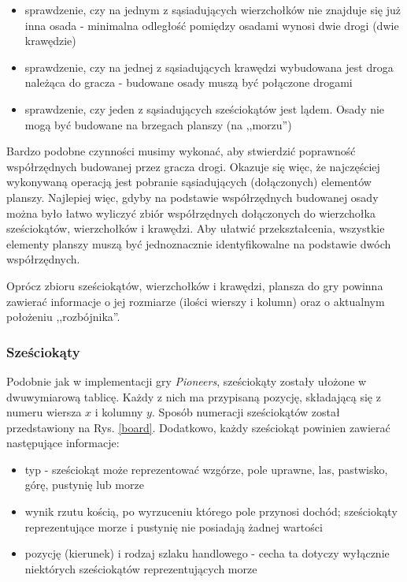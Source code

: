 \documentclass[a4paper,12pt]{article}
\providecommand{\imref}[1]{Rys. \ref{#1}} %
\begin{document}
\begin{itemize}
\item sprawdzenie, czy na jednym z sąsiadujących wierzchołków nie
  znajduje się już inna osada - minimalna odległość pomiędzy osadami
  wynosi dwie drogi (dwie krawędzie)
\item sprawdzenie, czy na jednej z sąsiadujących krawędzi wybudowana
  jest droga należąca do gracza - budowane osady muszą być połączone
  drogami
\item sprawdzenie, czy jeden z sąsiadujących sześciokątów jest
  lądem. Osady nie mogą być budowane na brzegach planszy (na
  ,,morzu'')
\end{itemize}

Bardzo podobne czynności musimy wykonać, aby stwierdzić poprawność
współrzędnych budowanej przez gracza drogi. Okazuje się więc, że
najczęściej wykonywaną operacją jest pobranie sąsiadujących
(dołączonych) elementów planszy. Najlepiej więc, gdyby na podstawie
współrzędnych budowanej osady można było łatwo wyliczyć zbiór
współrzędnych dołączonych do wierzchołka sześciokątów, wierzchołków i
krawędzi. Aby ułatwić przekształcenia, wszystkie elementy planszy
muszą być jednoznacznie identyfikowalne na podstawie dwóch
współrzędnych.

Oprócz zbioru sześciokątów, wierzchołków i krawędzi, plansza do gry
powinna zawierać informacje o jej rozmiarze (ilości wierszy i kolumn)
oraz o aktualnym położeniu ,,rozbójnika''.

\subsubsection{Sześciokąty}
Podobnie jak w implementacji gry \emph{Pioneers}, sześciokąty zostały
ułożone w dwuwymiarową tablicę. Każdy z nich ma przypisaną pozycję,
składającą się z numeru wiersza $x$ i kolumny $y$. Sposób numeracji
sześciokątów został przedstawiony na \imref{board}. Dodatkowo, każdy
sześciokąt powinien zawierać następujące informacje:

\begin{itemize}
\item typ - sześciokąt może reprezentować wzgórze, pole uprawne, las,
  pastwisko, górę, pustynię lub morze
\item wynik rzutu kością, po wyrzuceniu którego pole przynosi
  dochód; sześciokąty reprezentujące morze i pustynię nie posiadają
  żadnej wartości
\item pozycję (kierunek) i rodzaj szlaku handlowego - cecha ta dotyczy
  wyłącznie niektórych sześciokątów reprezentujących morze
\end{itemize}
\end{document}
